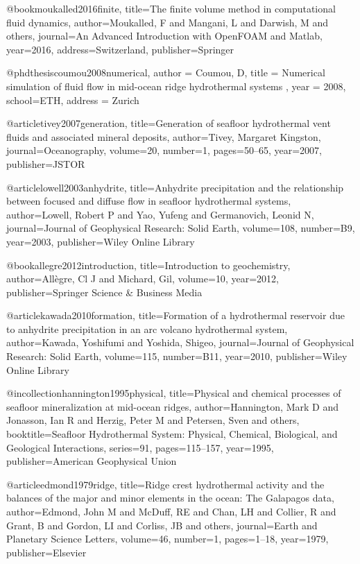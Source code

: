 @book{moukalled2016finite,
  title={The finite volume method in computational fluid dynamics},
  author={Moukalled, F and Mangani, L and Darwish, M and others},
  journal={An Advanced Introduction with OpenFOAM and Matlab},
  year={2016},
  address={Switzerland},
  publisher={Springer}
}

@phdthesis{coumou2008numerical,
	author = {Coumou, D},
	title = {{Numerical simulation of fluid flow in mid-ocean ridge hydrothermal systems }},
	year = {2008},
	school={ETH},
	address = {Zurich}
}

@article{tivey2007generation,
	title={Generation of seafloor hydrothermal vent fluids and associated mineral deposits},
	author={Tivey, Margaret Kingston},
	journal={Oceanography},
	volume={20},
	number={1},
	pages={50--65},
	year={2007},
	publisher={JSTOR}
}

@article{lowell2003anhydrite,
	title={Anhydrite precipitation and the relationship between focused and diffuse flow in seafloor hydrothermal systems},
	author={Lowell, Robert P and Yao, Yufeng and Germanovich, Leonid N},
	journal={Journal of Geophysical Research: Solid Earth},
	volume={108},
	number={B9},
	year={2003},
	publisher={Wiley Online Library}
}

@book{allegre2012introduction,
	title={Introduction to geochemistry},
	author={All{\`e}gre, Cl J and Michard, Gil},
	volume={10},
	year={2012},
	publisher={Springer Science \& Business Media}
}

@article{kawada2010formation,
	title={Formation of a hydrothermal reservoir due to anhydrite precipitation in an arc volcano hydrothermal system},
	author={Kawada, Yoshifumi and Yoshida, Shigeo},
	journal={Journal of Geophysical Research: Solid Earth},
	volume={115},
	number={B11},
	year={2010},
	publisher={Wiley Online Library}
}

@incollection{hannington1995physical,
	title={Physical and chemical processes of seafloor mineralization at mid-ocean ridges},
	author={Hannington, Mark D and Jonasson, Ian R and Herzig, Peter M and Petersen, Sven and others},
	booktitle={Seafloor Hydrothermal System: Physical, Chemical, Biological, and Geological Interactions},
	series={91},
	pages={115--157},
	year={1995},
	publisher={American Geophysical Union}
}

@article{edmond1979ridge,
  title={Ridge crest hydrothermal activity and the balances of the major and minor elements in the ocean: The Galapagos data},
  author={Edmond, John M and McDuff, RE and Chan, LH and Collier, R and Grant, B and Gordon, LI and Corliss, JB and others},
  journal={Earth and Planetary Science Letters},
  volume={46},
  number={1},
  pages={1--18},
  year={1979},
  publisher={Elsevier}
}